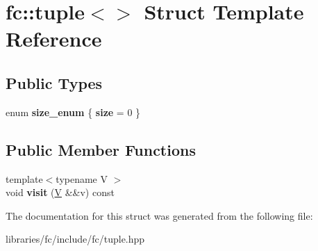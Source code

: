 \hypertarget{structfc_1_1tuple_3_4}{}\section{fc\+:\+:tuple$<$$>$ Struct Template Reference}
\label{structfc_1_1tuple_3_4}
\subsection*{Public Types}
\begin{DoxyCompactItemize}
\item 
\mbox{\label{structfc_1_1tuple_3_4_a9becc694b96ad8718291718f19884d21}} 
enum {\bfseries size\+\_\+enum} \{ {\bfseries size} = 0
 \}
\end{DoxyCompactItemize}
\subsection*{Public Member Functions}
\begin{DoxyCompactItemize}
\item 
\mbox{\label{structfc_1_1tuple_3_4_ad0bd7853f3a84318e993f319ef6378e3}} 
{\footnotesize template$<$typename V $>$ }\\void {\bfseries visit} (\mbox{\hyperlink{struct_v}{V}} \&\&v) const
\end{DoxyCompactItemize}


The documentation for this struct was generated from the following file\+:\begin{DoxyCompactItemize}
\item 
libraries/fc/include/fc/tuple.\+hpp\end{DoxyCompactItemize}
